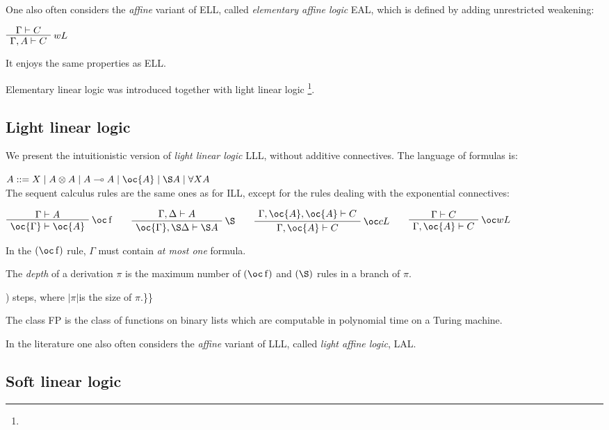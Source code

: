 One also often considers the \emph{affine} variant of ELL, called
\emph{elementary affine logic} EAL, which is defined by adding
unrestricted weakening:

\(\AxRule{\Gamma\vdash C}
\LabelRule{ w L}
\UnaRule{\Gamma,A\vdash C}
\DisplayProof\)

It enjoys the same properties as ELL.

Elementary linear logic was introduced together with light linear logic
\footnote{}.


\subsection{Light linear logic}\label{light-linear-logic}

We present the intuitionistic version of \emph{light linear logic} LLL,
without additive connectives. The language of formulas is:

\(A ::= X \mid A\tens A \mid A\limp A  \mid \oc{A} \mid \pg{A} \mid \forall X A\)\\
The sequent calculus rules are the same ones as for ILL, except for the
rules dealing with the exponential connectives:

\(\AxRule{\Gamma\vdash A}
\LabelRule{\oc\rulename{f} }
\UnaRule{\oc{\Gamma}\vdash\oc{A}}
\DisplayProof
\qquad
\AxRule{\Gamma, \Delta\vdash A}
\LabelRule{\pg }
\UnaRule{\oc{\Gamma}, \pg \Delta\vdash\pg{A}}
\DisplayProof
\qquad
\AxRule{\Gamma,\oc{A},\oc{A}\vdash C}
\LabelRule{\oc c L}
\UnaRule{\Gamma,\oc{A}\vdash C}
\DisplayProof
\qquad
\AxRule{\Gamma\vdash C}
\LabelRule{\oc w L}
\UnaRule{\Gamma,\oc{A}\vdash C}
\DisplayProof\)

In the \((\oc\rulename{f})\) rule, \(\Gamma\) must contain \emph{at most
one} formula.

The \emph{depth} of a derivation \(\pi\) is the maximum number of
\((\oc\rulename{f})\) and \((\pg)\) rules in a branch of \(\pi\).

) steps, where \(|\pi|\)is the size of \(\pi\).\}\}

The class FP is the class of functions on binary lists which are
computable in polynomial time on a Turing machine.

In the literature one also often considers the \emph{affine} variant of
LLL, called \emph{light affine logic}, LAL.

\subsection{Soft linear logic}\label{soft-linear-logic}

